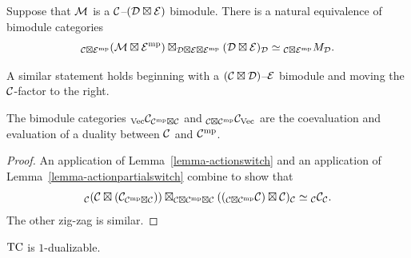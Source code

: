 \documentclass{amsart}
\begin{document}
\begin{lemma} \label{lemma-actionpartialswitch}
Suppose that $\mathcal M$ is a $\mathcal C$--$(\mathcal D \boxtimes \mathcal E)$ bimodule.  There is a natural equivalence of bimodule categories
$${}_{\mathcal C \boxtimes \mathcal E^{\mathrm{mp}}} (\mathcal M \boxtimes \mathcal E^{\mathrm{mp}}) \boxtimes_{\mathcal D \boxtimes \mathcal E \boxtimes \mathcal E^{\mathrm{mp}}} (\mathcal D \boxtimes \mathcal E)_\mathcal D \simeq {}_{\mathcal C \boxtimes \mathcal E^{\mathrm{mp}}}M_\mathcal D.$$
\end{lemma}

\nid A similar statement holds beginning with a $(\mathcal C \boxtimes \mathcal D)$--$\mathcal E$ bimodule and moving the $\mathcal C$-factor to the right.

\begin{proposition} \label{thm:objduals}
The bimodule categories ${}_\mathrm{\mathrm{Vec}} \mathcal C_{\mathcal C^{\mathrm{mp}} \boxtimes \mathcal C}$ and ${}_{\mathcal C \boxtimes \mathcal C^{\mathrm{mp}}} \mathcal C_{\mathrm{Vec}}$ are the coevaluation and evaluation of a duality between $\mathcal C$ and $\mathcal C^{\mathrm{mp}}$.
\end{proposition}
\begin{proof}
An application of Lemma~\ref{lemma-actionswitch} and an application of Lemma~\ref{lemma-actionpartialswitch} combine to show that
\[
{}_\mathcal C (\mathcal C \boxtimes (\mathcal C_{\mathcal C^{\mathrm{mp}} \boxtimes \mathcal C})) \boxtimes_{\mathcal C \boxtimes \mathcal C^{\mathrm{mp}} \boxtimes \mathcal C} (({}_{\mathcal C \boxtimes \mathcal C^{\mathrm{mp}}} \mathcal C) \boxtimes \mathcal C)_\mathcal C
\simeq
{}_\mathcal C \mathcal C_\mathcal C.
\]
The other zig-zag is similar.
\end{proof}

\begin{corollary}
	$\mathrm{TC}$ is $1$-dualizable. 
\end{corollary}

\end{document}
